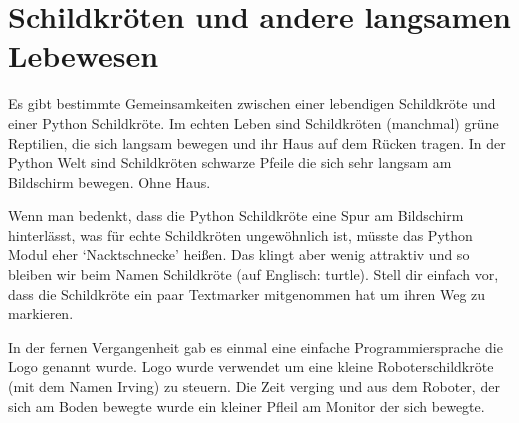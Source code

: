 

\chapter{Schildkröten und andere langsamen Lebewesen}\label{ch:turtles}

Es gibt bestimmte Gemeinsamkeiten zwischen einer lebendigen Schildkröte und einer Python Schildkröte. Im echten Leben sind Schildkröten (manchmal) grüne Reptilien, die sich langsam bewegen und ihr Haus auf dem Rücken tragen. In der Python Welt sind Schildkröten schwarze Pfeile die sich sehr langsam am Bildschirm bewegen. Ohne Haus.

Wenn man bedenkt, dass die Python Schildkröte eine Spur am Bildschirm hinterlässt, was für echte Schildkröten ungewöhnlich ist, müsste das Python Modul eher `Nacktschnecke' heißen. Das klingt aber wenig attraktiv und so bleiben wir beim Namen Schildkröte (auf Englisch: turtle). Stell dir einfach vor, dass die Schildkröte ein paar Textmarker mitgenommen hat um ihren Weg zu markieren.

In der fernen Vergangenheit gab es einmal eine einfache Programmiersprache die Logo genannt wurde. Logo wurde verwendet um eine kleine Roboterschildkröte (mit dem Namen Irving) zu steuern. Die Zeit verging und aus dem Roboter, der sich am Boden bewegte wurde ein kleiner Pfleil am Monitor der sich bewegte.

